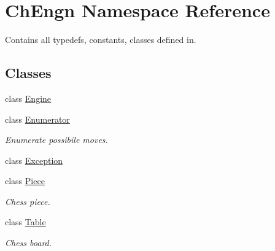 \hypertarget{namespaceChEngn}{
\section{ChEngn Namespace Reference}
\label{namespaceChEngn}
}


Contains all typedefs, constants, classes defined in.  


\subsection*{Classes}
\begin{DoxyCompactItemize}
\item 
class \hyperlink{classChEngn_1_1Engine}{Engine}
\item 
class \hyperlink{classChEngn_1_1Enumerator}{Enumerator}
\begin{DoxyCompactList}\small\item\em Enumerate possibile moves. \item\end{DoxyCompactList}\item 
class \hyperlink{classChEngn_1_1Exception}{Exception}
\item 
class \hyperlink{classChEngn_1_1Piece}{Piece}
\begin{DoxyCompactList}\small\item\em Chess piece. \item\end{DoxyCompactList}\item 
class \hyperlink{classChEngn_1_1Table}{Table}
\begin{DoxyCompactList}\small\item\em Chess board. \item\end{DoxyCompactList}\end{DoxyCompactItemize}
